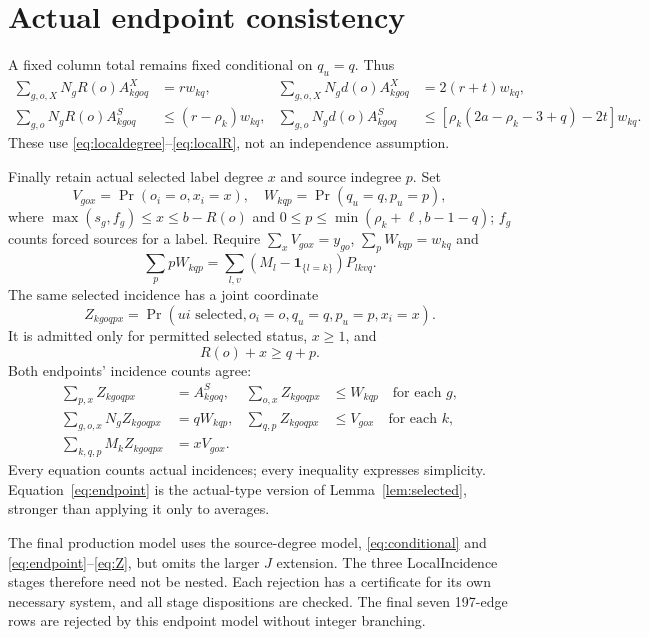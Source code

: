 \documentclass[11pt,a4paper]{article}
\newcommand{\ind}[1]{\mathbf1_{\{#1\}}}\newcommand{\pos}[1]{[#1]_+}\newcommand{\floor}[1]{\left\lfloor#1\right\rfloor}\newcommand{\ceil}[1]{\left\lceil#1\right\rceil}
\begin{document}
\section{Actual endpoint consistency}\label{sec:endpoints}
A fixed column total remains fixed conditional on $q_u=q$. Thus
\begin{align}
 \sum_{g,o,X}N_gR(o)A^X_{kgoq}&=r w_{kq},&
 \sum_{g,o,X}N_gd(o)A^X_{kgoq}&=2(r+t)w_{kq},\label{eq:conditional}\\
 \sum_{g,o}N_gR(o)A^S_{kgoq}&\le(r-\rho_k)w_{kq},&
 \sum_{g,o}N_gd(o)A^S_{kgoq}&\le[\rho_k(2a-\rho_k-3+q)-2t]w_{kq}.\nonumber
\end{align}
These use \eqref{eq:localdegree}--\eqref{eq:localR}, not an independence assumption.

Finally retain actual selected label degree $x$ and source indegree $p$. Set
\[
 V_{gox}=\Pr(o_i=o,x_i=x),\quad
 W_{kqp}=\Pr(q_u=q,p_u=p),
\]
where $\max(s_g,f_g)\le x\le b-R(o)$ and
$0\le p\le\min(\rho_k+\ell,b-1-q)$; $f_g$ counts forced sources for a label. Require $\sum_xV_{gox}=y_{go}$, $\sum_pW_{kqp}=w_{kq}$ and
\[
 \sum_ppW_{kqp}=\sum_{l,v}(M_l-\ind{l=k})P_{lkvq}.
\]
The same selected incidence has a joint coordinate
\[
 Z_{kgoqpx}=\Pr(ui\text{ selected},o_i=o,q_u=q,p_u=p,x_i=x).
\]
It is admitted only for permitted selected status, $x\ge1$, and
\begin{equation}\label{eq:endpoint}
 R(o)+x\ge q+p.
\end{equation}
Both endpoints' incidence counts agree:
\begin{align}
 \sum_{p,x}Z_{kgoqpx}&=A^S_{kgoq},&
 \sum_{o,x}Z_{kgoqpx}&\le W_{kqp}\quad\text{for each }g,\label{eq:Z}\\
 \sum_{g,o,x}N_gZ_{kgoqpx}&=qW_{kqp},&
 \sum_{q,p}Z_{kgoqpx}&\le V_{gox}\quad\text{for each }k,\nonumber\\
 \sum_{k,q,p}M_kZ_{kgoqpx}&=xV_{gox}.&&\nonumber
\end{align}
Every equation counts actual incidences; every inequality expresses simplicity. Equation~\eqref{eq:endpoint} is the actual-type version of Lemma~\ref{lem:selected}, stronger than applying it only to averages.

The final production model uses the source-degree model, \eqref{eq:conditional} and \eqref{eq:endpoint}--\eqref{eq:Z}, but omits the larger $J$ extension. The three LocalIncidence stages therefore need not be nested. Each rejection has a certificate for its own necessary system, and all stage dispositions are checked. The final seven 197-edge rows are rejected by this endpoint model without integer branching.
\end{document}
